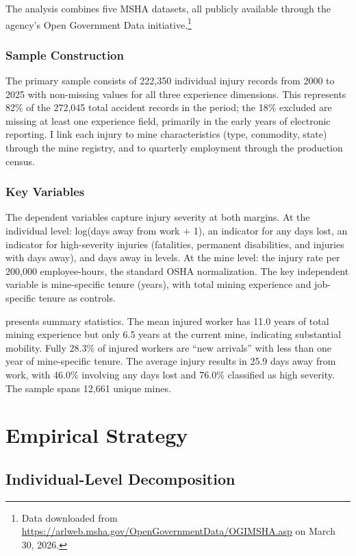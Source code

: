 \documentclass[12pt]{article}
\begin{document}
The analysis combines five MSHA datasets, all publicly available through the agency's Open Government Data initiative.\footnote{Data downloaded from \url{https://arlweb.msha.gov/OpenGovernmentData/OGIMSHA.asp} on March 30, 2026.}

\subsubsection*{Sample Construction} The primary sample consists of 222,350 individual injury records from 2000 to 2025 with non-missing values for all three experience dimensions. This represents 82\% of the 272,045 total accident records in the period; the 18\% excluded are missing at least one experience field, primarily in the early years of electronic reporting. I link each injury to mine characteristics (type, commodity, state) through the mine registry, and to quarterly employment through the production census.

\subsubsection*{Key Variables} The dependent variables capture injury severity at both margins. At the individual level: log(days away from work $+$ 1), an indicator for any days lost, an indicator for high-severity injuries (fatalities, permanent disabilities, and injuries with days away), and days away in levels. At the mine level: the injury rate per 200,000 employee-hours, the standard OSHA normalization. The key independent variable is mine-specific tenure (years), with total mining experience and job-specific tenure as controls.



 presents summary statistics. The mean injured worker has 11.0 years of total mining experience but only 6.5 years at the current mine, indicating substantial mobility. Fully 28.3\% of injured workers are ``new arrivals'' with less than one year of mine-specific tenure. The average injury results in 25.9 days away from work, with 46.0\% involving any days lost and 76.0\% classified as high severity. The sample spans 12,661 unique mines.


\section{Empirical Strategy}\label{sec:strategy}

\subsection{Individual-Level Decomposition}
\end{document}
